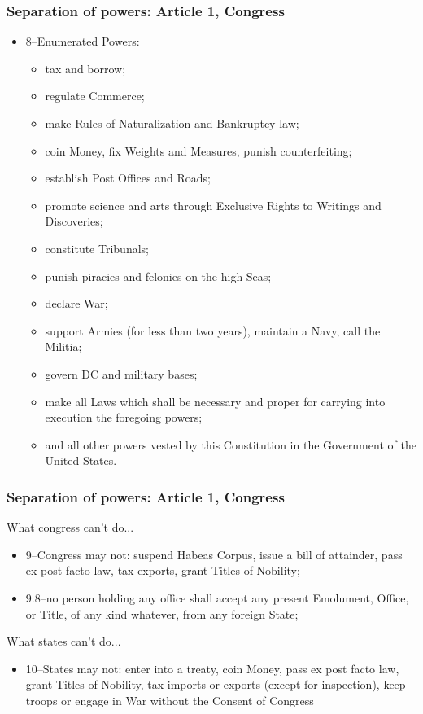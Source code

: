 \documentclass[aspectratio=169]{beamer}
\theoremstyle{principle}
\begin{document}
\begin{frame}
\frametitle{Separation of powers: Article 1, Congress}

\begin{itemize}
\item 8--Enumerated Powers:
\begin{itemize} 
\item tax and borrow;
\item regulate Commerce;
\item make Rules of Naturalization and Bankruptcy law;
\item coin Money, fix Weights and Measures, punish counterfeiting;
\item establish Post Offices and Roads;
\item promote science and arts through Exclusive Rights to Writings and Discoveries;
\item constitute Tribunals;
\item punish piracies and felonies on the high Seas;
\item declare War;
\item support Armies (for less than two years), maintain a Navy, call the Militia;
\item govern DC and military bases;
\item make all Laws which shall be necessary and proper for carrying into execution the foregoing powers;
\item and all other powers vested by this Constitution in the Government of the United States.
\end{itemize}
\end{itemize}

\end{frame}

\begin{frame}
\frametitle{Separation of powers: Article 1, Congress}

What congress can't do...
\bigskip
\begin{itemize} 
\item 9--Congress may not: suspend Habeas Corpus, issue a bill of attainder, pass ex post facto law, tax exports, grant Titles of Nobility;
\bigskip
\bigskip
\item 9.8--no person holding any office shall accept any present Emolument, Office, or Title, of any kind whatever, from any foreign State;
\end{itemize}
\bigskip
What states can't do...
\begin{itemize}
\item 10--States may not: enter into a treaty, coin Money, pass ex post facto law, grant Titles of Nobility, tax imports or exports (except for inspection), keep troops or engage in War without the Consent of Congress
\end{itemize}

\end{frame}
\end{document}
